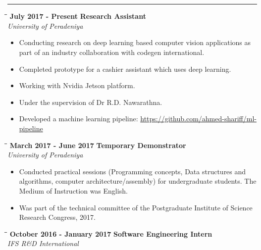 \documentclass[a4paper,11pt]{article}
\begin{document}
\vspace{10pt}\\\linebreak[4]
\noindent\textbf{\color{MidnightBlue}\large{}}
\vspace{-8pt}\noindent\\\rule{0.75\textwidth}{0.4pt}
\vspace{-5pt}
\begin{tabbing}
  \=\hspace*{6cm}\=\hspace*{5cm}\= \kill
  \>\textbf{\large \textbar{}}\textbf{ July 2017 - Present} \> \textbf{Research Assistant}\\\>\> \emph{University of Peradeniya}
\end{tabbing}
\vspace{-15pt}
\begin{itemize}
  \setlength\itemsep{-3pt}
\item Conducting research on deep learning based computer vision applications as part of an industry collaboration with codegen international. 
\item Completed prototype for a cashier assistant which uses deep learning.
\item Working with Nvidia Jetson platform.
\item Under the supervision of Dr R.D. Nawarathna.
\item Developed a machine learning pipeline: {\url{https://github.com/ahmed-shariff/ml-pipeline}}
\end{itemize}
\begin{tabbing}
  \=\hspace*{6cm}\=\hspace*{5cm}\= \kill
  \>\textbf{\large \textbar{}}\textbf{ March 2017 - June 2017} \> \textbf{Temporary Demonstrator}\\\>\> \emph{University of Peradeniya}
\end{tabbing}
\vspace{-15pt}
\begin{itemize}
  \setlength\itemsep{-3pt}
\item Conducted practical sessions (Programming concepts, Data structures and algorithms, computer architecture/assembly) for undergraduate students. The Medium of Instruction was English.
\item Was part of the technical committee of the Postgraduate Institute of Science Research Congress, 2017.
\end{itemize}
\begin{tabbing}
  \=\hspace*{6cm}\=\hspace*{5cm}\= \kill
  \>\textbf{\large \textbar{}}\textbf{ October 2016 - January 2017} \> \textbf{Software Engineering Intern}\\\>\> \emph{IFS R\&D International}
\end{tabbing}
\end{document}
